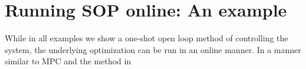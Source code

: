 \section{Running SOP online: An example}
\label{sec:online}

While in all examples we show a one-shot open loop method of controlling the system, the underlying optimization can be run in an online manner. In a manner similar to MPC and the method in \cite{}